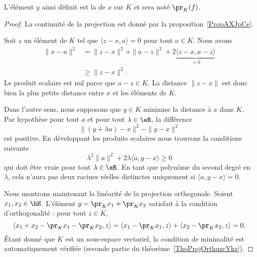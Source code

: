     L'élément \( y\) ainsi définit est la  de \( x\) sur \( K\) et sera noté \( \pr_K(f)\).

\begin{proof}

    La continuité de la projection est donné par la proposition~\ref{PropAXJpCe}.

            Soit \( z\) un élément de \( K\) tel que \( \langle z-x, a\rangle =0\) pour tout \( a\in K\). Nous avons
            \begin{subequations}
                \begin{align}
                    \| x-a \|^2&=\| z-x \|^2+\| a-z \|^2+2\underbrace{\langle z-x, a-z\rangle}_{=0}\\
                    &\geq \| z-x \|^2.
                \end{align}
            \end{subequations}
            Le produit scalaire est nul parce que \( a-z\in K\). La distance \( \| z-x \|\) est donc bien la plus petite distance entre \( x\) et les éléments de \( K\).

            Dans l'autre sens, nous supposons que \( y\in K\) minimise la distance à \( x\) dans \( K\). Par hypothèse pour tout \( a\) et pour tout \( \lambda\in \eR\), la différence
            \begin{equation}
                \| (y+\lambda a)-x \|^2-\| y-x \|^2
            \end{equation}
            est positive. En développant les produits scalaires nous trouvons la conditions suivante
            \begin{equation}
                \lambda^2\| a \|^2+2\lambda\langle a, y-x\rangle \geq 0
            \end{equation}
            qui doit être vraie pour tout \( \lambda\in\eR\). En tant que polynôme du second degré en \( \lambda\), cela n'aura pas deux racines réelles distinctes uniquement si \( \langle a, y-x\rangle =0\).

            Nous montrons maintenant la linéarité de la projection orthogonale. Soient \( x_1,x_2\in\hH\). L'élément \( y=\pr_Kx_1+\pr_Kx_2\) satisfait à la condition d'orthogonalité : pour tout \( z\in K\),
    \begin{equation}
        \langle x_1+x_2-\pr_Kx_1-\pr_Kx_2, z\rangle =\langle x_1-\pr_Kx_1, z\rangle +\langle x_2-\pr_Kx_2, z\rangle =0.
    \end{equation}
    Étant donné que \( K\) est un sous-espace vectoriel, la condition de minimalité est automatiquement vérifiée (seconde partie du théorème~\ref{ThoProjOrthuzcYkz}).


\end{proof}
